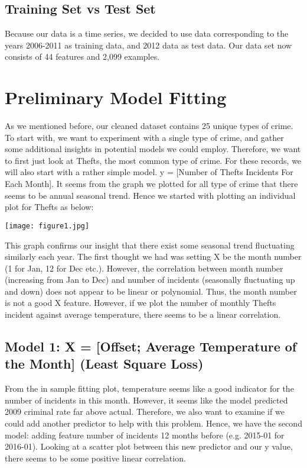 \documentclass{article}
\begin{document}
\subsection*{Training Set vs Test Set}
Because our data is a time series, we decided to use data corresponding to the years 2006-2011 as training data, and 2012 data as test data.   Our data set now consists of 44 features and 2,099 examples.

\section*{Preliminary Model Fitting}
As we mentioned before, our cleaned dataset contains 25 unique types of crime. To start with, we want to experiment with a single type of crime, and gather some additional insights in potential models we could employ.  Therefore, we want to first just look at Thefts, the most common type of crime. For these records, we will also start with a rather simple model.   y = [Number of Thefts Incidents For Each Month].  It seems from the graph we plotted for all type of crime that there seems to be annual seasonal trend. Hence we started with plotting an individual plot for Thefts as below:

\centerline{\texttt{[image: figure1.jpg]}}

This graph confirms our insight that there exist some seasonal trend fluctuating similarly each year. The first thought we had was setting X be the month number (1 for Jan, 12 for Dec etc.). However, the correlation between month number (increasing from Jan to Dec) and number of incidents (seasonally fluctuating up and down) does not appear to be linear or polynomial. Thus, the month number is not a good X feature.  However, if we plot the number of monthly Thefts incident against average temperature, there seems to be a linear correlation.

\subsection*{Model 1: X = [Offset; Average Temperature of the Month] (Least Square Loss)}
From the in sample fitting plot, temperature seems like a good indicator for the number of incidents in this month. However, it seems like the model predicted 2009 criminal rate far above actual. Therefore, we also want to examine if we could add another predictor to help with this problem. Hence, we have the second model: adding feature number of incidents 12 months before (e.g. 2015-01 for 2016-01). Looking at a scatter plot between this new predictor and our y value, there seems to be some positive linear correlation.
\end{document}
